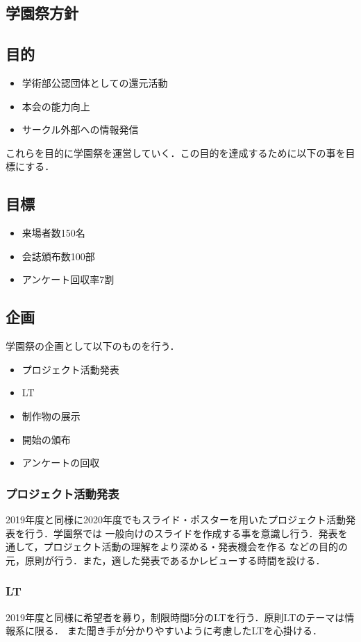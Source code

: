 \subsection*{学園祭方針}


\subsection*{目的}
\begin{itemize}
    \item 学術部公認団体としての還元活動
    \item 本会の能力向上
    \item サークル外部への情報発信
\end{itemize}
これらを目的に学園祭を運営していく．この目的を達成するために以下の事を目標にする．
\subsection*{目標}
\begin{itemize}
    \item 来場者数150名
    \item 会誌頒布数100部
    \item アンケート回収率7割
\end{itemize}
\subsection*{企画}
学園祭の企画として以下のものを行う．
\begin{itemize}
    \item プロジェクト活動発表
    \item LT
    \item 制作物の展示
    \item 開始の頒布
    \item アンケートの回収
\end{itemize}
\subsubsection*{プロジェクト活動発表}
2019年度と同様に2020年度でもスライド・ポスターを用いたプロジェクト活動発表を行う．学園祭では
一般向けのスライドを作成する事を意識し行う．発表を通して，プロジェクト活動の理解をより深める・発表機会を作る
などの目的の元，原則\firstGrade{}が行う．また，適した発表であるかレビューする時間を設ける．

\subsubsection*{LT}
2019年度と同様に希望者を募り，制限時間5分のLTを行う．原則LTのテーマは情報系に限る．
また聞き手が分かりやすいように考慮したLTを心掛ける．

